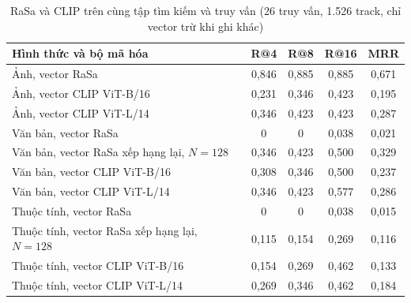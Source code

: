 \begin{table}[H]
\centering
\caption{RaSa và CLIP trên cùng tập tìm kiếm và truy vấn (26 truy vấn, 1.526 track, chỉ vector trừ khi ghi khác)}
\label{tab:encoders}
\begin{tabularx}{\textwidth}{|L|c|c|c|c|}
\hline
\textbf{Hình thức và bộ mã hóa} & \textbf{R@4} & \textbf{R@8} & \textbf{R@16} & \textbf{MRR} \\
\hline
Ảnh, vector RaSa & 0,846 & 0,885 & 0,885 & 0,671 \\
\hline
Ảnh, vector CLIP ViT-B/16 & 0,231 & 0,346 & 0,423 & 0,195 \\
\hline
Ảnh, vector CLIP ViT-L/14 & 0,346 & 0,423 & 0,423 & 0,287 \\
\hline
Văn bản, vector RaSa & 0 & 0 & 0,038 & 0,021 \\
\hline
Văn bản, vector RaSa xếp hạng lại, $N = 128$ & 0,346 & 0,423 & 0,500 & 0,329 \\
\hline
Văn bản, vector CLIP ViT-B/16 & 0,308 & 0,346 & 0,500 & 0,237 \\
\hline
Văn bản, vector CLIP ViT-L/14 & 0,346 & 0,423 & 0,577 & 0,286 \\
\hline
Thuộc tính, vector RaSa & 0 & 0 & 0,038 & 0,015 \\
\hline
Thuộc tính, vector RaSa xếp hạng lại, $N = 128$ & 0,115 & 0,154 & 0,269 & 0,116 \\
\hline
Thuộc tính, vector CLIP ViT-B/16 & 0,154 & 0,269 & 0,462 & 0,133 \\
\hline
Thuộc tính, vector CLIP ViT-L/14 & 0,269 & 0,346 & 0,462 & 0,184 \\
\hline
\end{tabularx}
\end{table}
